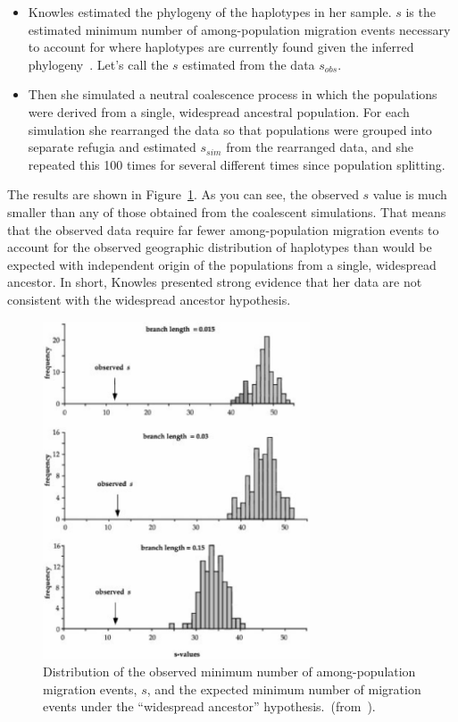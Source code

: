 \begin{itemize}

\item Knowles estimated the phylogeny of the haplotypes in her
  sample. $s$ is the estimated minimum number of among-population
  migration events necessary to account for where haplotypes are
  currently found given the inferred
  phylogeny~\cite{Slatkin-Maddison-1989}. Let's call the $s$ estimated
  from the data $s_{obs}$.

\item Then she simulated a neutral coalescence process in which the
  populations were derived from a single, widespread ancestral
  population. For each simulation she rearranged the data so that
  populations were grouped into separate refugia and estimated $s_{sim}$
  from the rearranged data, and she repeated this 100 times for
  several different times since population splitting.

\end{itemize}

\noindent The results are shown in
Figure~\ref{fig:knowles-s-values}. As you can see, the observed $s$
value is much smaller than any of those obtained from the coalescent
simulations. That means that the observed data require far fewer
among-population migration events to account for the observed
geographic distribution of haplotypes than would be expected with
independent origin of the populations from a single, widespread
ancestor. In short, Knowles presented strong evidence that her data
are not consistent with the widespread ancestor
hypothesis.

\begin{figure}
\begin{center}
\includegraphics[height=10cm]{knowles-s-values.eps}
\end{center}
\caption{Distribution of the observed minimum number of
  among-population migration events, $s$, and the expected minimum
  number of migration events under the ``widespread ancestor''
  hypothesis.~(from~\cite{Knowles-2001}).}\label{fig:knowles-s-values}
\end{figure}

